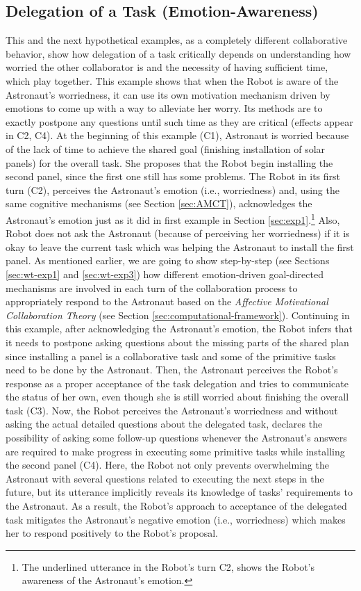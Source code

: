 \subsection{Delegation of a Task (Emotion-Awareness)}
\label{sec:exp3}

This and the next hypothetical examples, as a completely different collaborative
behavior, show how delegation of a task critically depends on understanding how
worried the other collaborator is and the necessity of having sufficient time,
which play together. This example shows that when the Robot is aware of the
Astronaut's worriedness, it can use its own motivation mechanism driven by
emotions to come up with a way to alleviate her worry. Its methods are to
exactly postpone any questions until such time as they are critical (effects
appear in C2, C4). At the beginning of this example (C1), Astronaut is worried
because of the lack of time to achieve the shared goal (finishing installation
of solar panels) for the overall task. She proposes that the Robot begin
installing the second panel, since the first one still has some problems. The
Robot in its first turn (C2), perceives the Astronaut's emotion (i.e.,
worriedness) and, using the same cognitive mechanisms (see Section
\ref{sec:AMCT}), acknowledges the Astronaut's emotion just as it did in first
example in Section \ref{sec:exp1}.\footnote{The underlined utterance in the
Robot's turn C2, shows the Robot's awareness of the Astronaut's emotion.} Also,
Robot does not ask the Astronaut (because of perceiving her worriedness) if it
is okay to leave the current task which was helping the Astronaut to install the
first panel. As mentioned earlier, we are going to show step-by-step (see
Sections \ref{sec:wt-exp1} and \ref{sec:wt-exp3}) how different emotion-driven
goal-directed mechanisms are involved in each turn of the collaboration process
to appropriately respond to the Astronaut based on the \textit{Affective
Motivational Collaboration Theory} (see Section
\ref{sec:computational-framework}). Continuing in this example, after
acknowledging the Astronaut's emotion, the Robot infers that it needs to
postpone asking questions about the missing parts of the shared plan since
installing a panel is a collaborative task and some of the primitive tasks need
to be done by the Astronaut. Then, the Astronaut perceives the Robot's response
as a proper acceptance of the task delegation and tries to communicate the
status of her own, even though she is still worried about finishing the overall
task (C3). Now, the Robot perceives the Astronaut's worriedness and without
asking the actual detailed questions about the delegated task, declares the
possibility of asking some follow-up questions whenever the Astronaut's answers
are required to make progress in executing some primitive tasks while installing
the second panel (C4). Here, the Robot not only prevents overwhelming the
Astronaut with several questions related to executing the next steps in the
future, but its utterance implicitly reveals its knowledge of tasks'
requirements to the Astronaut. As a result, the Robot's approach to acceptance
of the delegated task mitigates the Astronaut's negative emotion (i.e.,
worriedness) which makes her to respond positively to the Robot's proposal.

